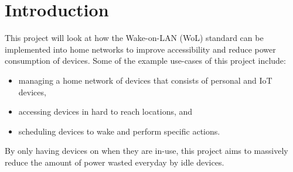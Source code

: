 
\section{Introduction}

This project will look at how the Wake-on-LAN (WoL) standard can be implemented into home networks to improve accessibility and reduce power consumption of devices.
\x
Some of the example use-cases of this project include:

\vspace{-2mm}
\begin{itemize}[noitemsep]
  \item managing a home network of devices that consists of personal and IoT devices,
  \item accessing devices in hard to reach locations, and
  \item scheduling devices to wake and perform specific actions.
\end{itemize}

\vspace{2mm}\noindent
By only having devices on when they are in-use, this project aims to massively reduce the amount of power wasted everyday by idle devices.